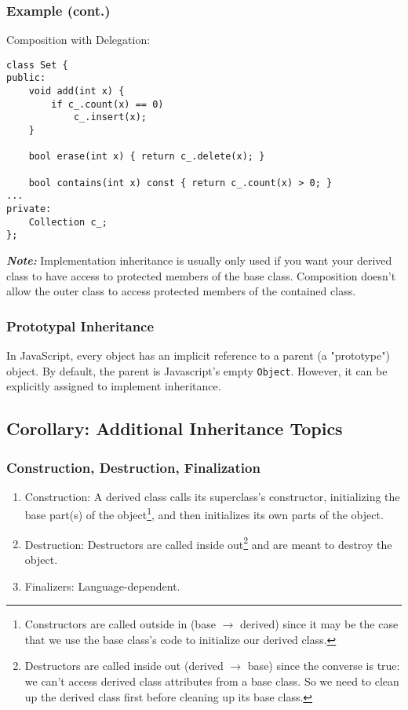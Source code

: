 \documentclass{article}
\begin{document}
\subsubsection*{Example (cont.)}
Composition with Delegation:
\begin{verbatim}
class Set {
public:
    void add(int x) {
        if c_.count(x) == 0)
            c_.insert(x);
    }

    bool erase(int x) { return c_.delete(x); }

    bool contains(int x) const { return c_.count(x) > 0; }
...
private:
    Collection c_;
};
\end{verbatim}
\textit{\textbf{Note:}} Implementation inheritance is usually only
used if you want your derived class to have access to protected
members of the base class. Composition doesn't allow the outer class
to access protected members of the contained class.

\subsubsection{Prototypal Inheritance}
In JavaScript, every object has an implicit reference to a parent (a
"prototype") object. By default, the parent is Javascript's empty
\texttt{Object}. However, it can be explicitly assigned to implement
inheritance.

\subsection{Corollary: Additional Inheritance Topics}
\subsubsection{Construction, Destruction, Finalization}
\begin{enumerate}[label=(\roman*)]
\item Construction: A derived class calls its superclass's
  constructor, initializing the base part(s) of the
  object\footnote{Constructors are called outside in (base $\to$
    derived) since it may be the case that we use the base class's
    code to initialize our derived class.}, and then
  initializes its own parts of the object.
\item Destruction: Destructors are called inside
  out\footnote{Destructors are called inside out
    (derived $\to$ base) since the converse is true: we can't access derived
    class attributes from a base class. So we need to clean up the
    derived class first before cleaning up its base class.} and are
  meant to destroy the object. 
\item Finalizers: Language-dependent.
\end{enumerate}
\end{document}
